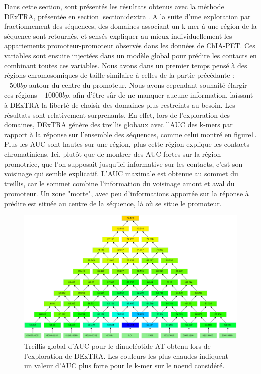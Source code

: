 \documentclass[french]{llncs}
\begin{document}
Dans cette section, sont présentés les résultats obtenus avec la méthode DExTRA, présentée en section \ref{section:dextra}. A la suite d'une exploration par fractionnement des séquences, des domaines associant un k-mer à une région de la séquence sont retournés, et sensés expliquer au mieux individuellement les appariements promoteur-promoteur observés dans les données de ChIA-PET. Ces variables sont ensuite injectées dans un modèle global pour prédire les contacts en combinant toutes ces variables. Nous avons dans un premier temps pensé à des régions chromosomiques de taille similaire à celles de la partie précédante : $\pm 500 bp$ autour du centre du promoteur. Nous avons cependant souhaité élargir ces régions $\pm 10000 bp$, afin d'être sûr de ne manquer aucune information, laissant à DExTRA la liberté de choisir des domaines plus restreints au besoin.
Les résultats sont relativement surprenants. En effet, lors de l'exploration des domaines, DExTRA génère des treillis globaux avec l'AUC des k-mers par rapport à la réponse sur l'ensemble des séquences, comme celui montré en figure\ref{fig/treillis_at}. Plus les AUC sont hautes sur une région, plus cette région explique les contacts chromatiniens. Ici, plutôt que de montrer des AUC fortes sur la région promotrice, que l'on supposait jusqu'ici informative sur les contacts, c'est son voisinage qui semble explicatif. L'AUC maximale est obtenue au sommet du treillis, car le sommet combine l'information du voisinage amont et aval du promoteur. Un zone "morte", avec peu d'informations apportée sur la réponse à prédire est située au centre de la séquence, là où se situe le promoteur.

\begin{figure}[h]
\begin{center}
 	\includegraphics[width=1\linewidth]{Images_Dextra/AT_low.png}
 \caption{Treillis global d'AUC pour le dinucléotide AT obtenu lors de l'exploration de DExTRA. Les couleurs les plus chaudes indiquent un valeur d'AUC plus forte pour le k-mer sur le noeud considéré.} \label{fig/treillis_at}
\end{center}
\end{figure}
\end{document}
